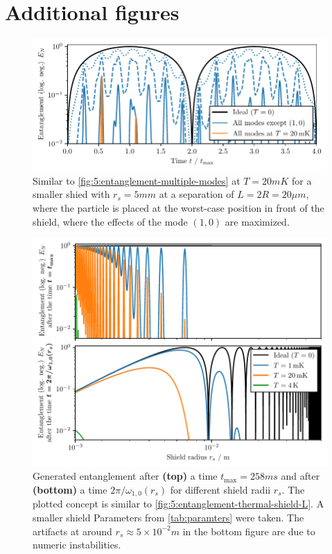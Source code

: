 \chapter{Additional figures}\label{apx:additiona-figures}
\begin{figure}[!htbp]
  \centering
  \includegraphics[width=\textwidth]{./../figures/vibrations/entanglement-dynamics-all-modes_rs-5mm.pdf}
  \caption{Similar to \cref{fig:5:entanglement-multiple-modes} at $T=20\si{mK}$ for a smaller shied with $r_s = 5\si{mm}$ at a separation of $L=2R = 20\si{\mu m}$, where the particle is placed at the worst-case position in front of the shield, where the effects of the mode $(1,0)$ are maximized.}
  \label{fig:apx:entanglement-thermal-shield-rs-5mm}
\end{figure}

\begin{figure}[!htbp]
  \centering
  \includegraphics[width=\textwidth]{./../figures/vibrations/all-modes-entanglement-rs.pdf}
  \caption{Generated entanglement after \textbf{(top)} a time $t_\mathrm{max} = 258\si{ms}$ and after \textbf{(bottom)} a time $2\pi/\omega_{1,0}(r_s)$ for different shield radii $r_s$. The plotted concept is similar to \cref{fig:5:entanglement-thermal-shield-L}. A smaller shield Parameters from \cref{tab:paramters} were taken. The artifacts at around $r_s \approx 5\times 10^{-2}\si{m}$ in the bottom figure are due to numeric instabilities.}
  \label{fig:apx:entanglement-thermal-shield-rs}
\end{figure}